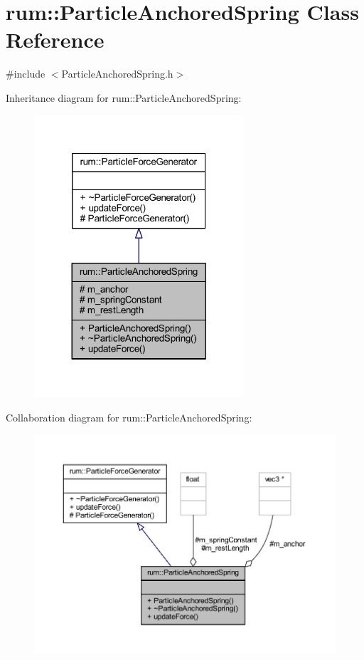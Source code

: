 \hypertarget{classrum_1_1_particle_anchored_spring}{}\section{rum\+:\+:Particle\+Anchored\+Spring Class Reference}
\label{classrum_1_1_particle_anchored_spring}


{\ttfamily \#include $<$Particle\+Anchored\+Spring.\+h$>$}



Inheritance diagram for rum\+:\+:Particle\+Anchored\+Spring\+:\nopagebreak
\begin{figure}[H]
\begin{center}
\leavevmode
\includegraphics[width=221pt]{classrum_1_1_particle_anchored_spring__inherit__graph}
\end{center}
\end{figure}


Collaboration diagram for rum\+:\+:Particle\+Anchored\+Spring\+:\nopagebreak
\begin{figure}[H]
\begin{center}
\leavevmode
\includegraphics[width=350pt]{classrum_1_1_particle_anchored_spring__coll__graph}
\end{center}
\end{figure}
